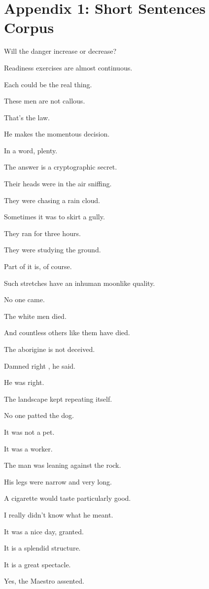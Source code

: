 \section*{Appendix 1: Short Sentences Corpus}
 
Will the danger increase or decrease?
 
Readiness exercises  are almost continuous. 

Each could be the real thing. 

These men are not callous. 

That's the law. 

He makes the momentous decision. 

In a word, plenty.

The answer is a cryptographic secret. 

Their heads were in the air sniffing. 

They were chasing a rain cloud. 

Sometimes it was to skirt a gully. 

They ran for three hours. 

They were studying the ground. 

Part of it is, of course. 

Such stretches have an inhuman moonlike quality. 

No one came. 

The white men died. 

And countless others like them have died. 

The aborigine is not deceived.


Damned right , he said. 

He was right. 

The landscape kept repeating itself. 

No one patted the dog. 

It was not a pet. 

It was a worker. 

The man was leaning against the rock. 

His legs were narrow and very long. 

A cigarette would taste particularly good. 

I really didn't know what he meant. 

It was a nice day, granted. 

It is a splendid structure. 

It is a great spectacle. 

Yes, the Maestro assented. 

